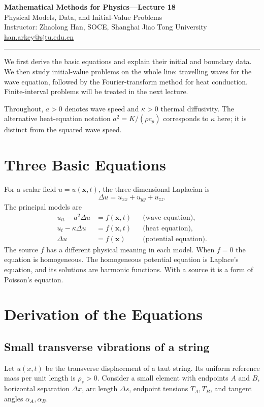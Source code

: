 \documentclass[11pt,a4paper]{article}
\begin{document}
\begin{center}
  {\Large\bfseries Mathematical Methods for Physics---Lecture 18}\\[6pt]
  {\large Physical Models, Data, and Initial-Value Problems}\\[10pt]
  Instructor: Zhaolong Han, SOCE, Shanghai Jiao Tong University\\
  \href{mailto:han.arkey@sjtu.edu.cn}{han.arkey@sjtu.edu.cn}
\end{center}
\hrule\medskip
We first derive the basic equations and explain their initial and boundary data.
We then study initial-value problems on the whole line: travelling waves for the
wave equation, followed by the Fourier-transform method for heat conduction.
Finite-interval problems will be treated in the next lecture.

Throughout, $a>0$ denotes wave speed and $\kappa>0$ thermal diffusivity.
The alternative heat-equation notation $a^2=K/(\rho c_p)$ corresponds to
$\kappa$ here; it is distinct from the squared wave speed.

\section{Three Basic Equations}
For a scalar field $u=u(\mathbf{x},t)$, the three-dimensional Laplacian is
\begin{equation}
  \Delta u=u_{xx}+u_{yy}+u_{zz}.
\end{equation}
The principal models are
\begin{align}
  u_{tt}-a^2\Delta u&=f(\mathbf{x},t)
     &&\text{(wave equation)},\\
  u_t-\kappa\Delta u&=f(\mathbf{x},t)
     &&\text{(heat equation)},\\
  \Delta u&=f(\mathbf{x})
     &&\text{(potential equation)}.
\end{align}
The source $f$ has a different physical meaning in each model. When $f=0$ the
equation is homogeneous. The homogeneous potential equation is Laplace's
equation, and its solutions are harmonic functions. With a source it is a form
of Poisson's equation.

\section{Derivation of the Equations}
\subsection{Small transverse vibrations of a string}
Let $u(x,t)$ be the transverse displacement of a taut string. Its uniform
reference mass per unit length is $\rho_s>0$. Consider a small element with
endpoints $A$ and $B$, horizontal separation $\Delta x$, arc length $\Delta s$,
endpoint tensions $T_A,T_B$, and tangent angles $\alpha_A,\alpha_B$.
\end{document}
